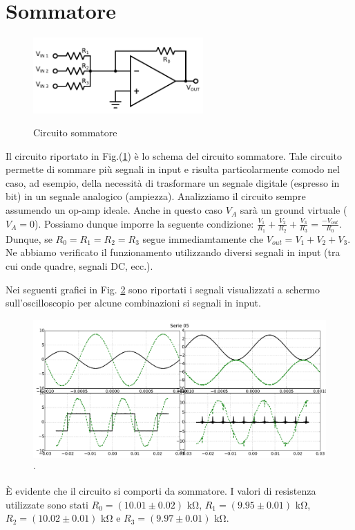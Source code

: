 \section{Sommatore}

\begin{figure}
	\caption{Circuito sommatore}
	\includegraphics[width=65mm]{ccsum.pdf}
	\label{fig:ccsum}
\end{figure}

Il circuito riportato in Fig.(\ref{fig:ccsum}) è lo schema del circuito sommatore.
Tale circuito permette di sommare più segnali in input e risulta particolarmente comodo nel caso, ad esempio, della necessità di trasformare un segnale digitale (espresso in bit) in un segnale analogico (ampiezza).
Analizziamo il circuito sempre assumendo un op-amp ideale.
Anche in questo caso $V_A$ sarà un ground virtuale ($V_A = 0$).
Possiamo dunque imporre la seguente condizione: $\frac{V_1}{R_1}+\frac{V_2}{R_2}+\frac{V_3}{R_3}=\frac{-V_{out}}{R_0}$.
Dunque, se $R_0=R_1=R_2=R_3$ segue immediamtamente che $V_{out}=V_1+V_2+V_3$.
Ne abbiamo verificato il funzionamento utilizzando diversi segnali in input (tra cui onde quadre, segnali DC, ecc.).

Nei seguenti grafici in Fig. \ref{fig:sum} sono riportati i segnali visualizzati a schermo sull'oscilloscopio per alcune combinazioni si segnali in input.

\begin{figure}[h]
	\centering
			\includegraphics[width=.9\textwidth]{sum_serie_05.pdf}
			\caption{$\cdot$}
			\label{fig:sum}
\end{figure}

È evidente che il circuito si comporti da sommatore. I valori di resistenza utilizzate sono stati $R_0=(10.01\pm0.02)$ \si{\kilo\ohm}, $R_1=(9.95\pm0.01)$ \si{\kilo\ohm}, $R_2=(10.02\pm 0.01)$ \si{\kilo\ohm} e $R_3=(9.97\pm0.01)$ \si{\kilo\ohm}. \phantom{xxxxxxxxxxxxxxxxxxxxxxxxxxxxxxxxxxxxxxxx}